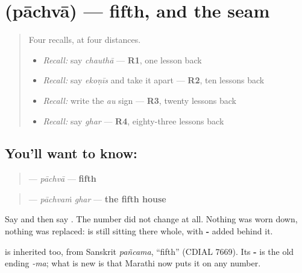 \section[\texorpdfstring{\mr{पाचवा} (pāchvā)}{पाचवा (pāchvā)}]{ (pāchvā) — fifth, and the seam}

\label{lesson:MR-C60-pachva}



\begin{quote}
Four recalls, at four distances.

\begin{itemize}
\raggedright
  \item \emph{Recall:} say \emph{chauthā} — \textbf{R1}, one lesson back
  \item \emph{Recall:} say \emph{ekoṇīs} and take it apart — \textbf{R2}, ten lessons back
  \item \emph{Recall:} write the \emph{au} sign — \textbf{R3}, twenty lessons back
  \item \emph{Recall:} say \emph{ghar} — \textbf{R4}, eighty-three lessons back
\end{itemize}
\end{quote}

\subsection*{You'll want to know: }
\begin{quote}
\textbf{} — \emph{pāchvā} — \textbf{fifth}
\end{quote}

\begin{quote}
\textbf{ } — \emph{pāchvaṁ ghar} — \textbf{the fifth house}
\end{quote}

Say \textbf{} and then say \textbf{}. The number did not change at all. Nothing was worn down, nothing was replaced: \textbf{} is still sitting there whole, with \textbf{-} added behind it.

\begin{cousinweb}
\textbf{} is inherited too, from Sanskrit \emph{pañcama}, \textquotedblleft{}fifth\textquotedblright{} (CDIAL 7669). Its \textbf{-} is the old ending \emph{-ma}; what is new is that Marathi now puts it on any number.
\end{cousinweb}

